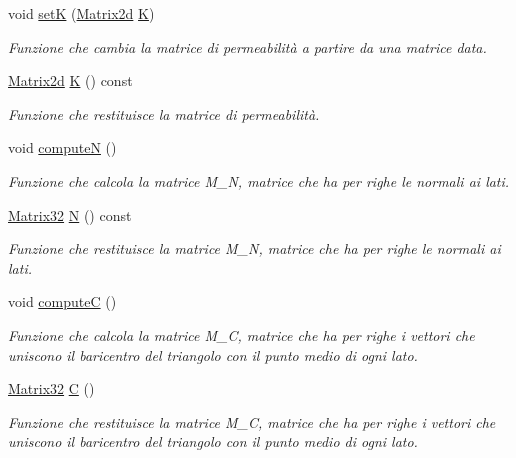 \begin{DoxyCompactItemize}
void \hyperlink{classMatrixBifurcationHandler_acbc7b99389ad5eacd86f73b0ed08829b}{set\-K} (\hyperlink{Core_8h_a1694976dd66ed00e5f0618f4f8821163}{Matrix2d} \hyperlink{classMatrixBifurcationHandler_ac7d63c6d730079862dd8238928d94b26}{K})
\begin{DoxyCompactList}\small\item\em Funzione che cambia la matrice di permeabilità a partire da una matrice data. \end{DoxyCompactList}\item 
\hyperlink{Core_8h_a1694976dd66ed00e5f0618f4f8821163}{Matrix2d} \hyperlink{classMatrixBifurcationHandler_ac7d63c6d730079862dd8238928d94b26}{K} () const 
\begin{DoxyCompactList}\small\item\em Funzione che restituisce la matrice di permeabilità. \end{DoxyCompactList}\item 
void \hyperlink{classMatrixBifurcationHandler_ac134a5731e6614e543241a018ccf8c34}{compute\-N} ()
\begin{DoxyCompactList}\small\item\em Funzione che calcola la matrice M\-\_\-\-N, matrice che ha per righe le normali ai lati. \end{DoxyCompactList}\item 
\hyperlink{Core_8h_aee82131e398edee47a44d675ee802368}{Matrix32} \hyperlink{classMatrixBifurcationHandler_a77f006579fad0f0f08c10bf684bbd16a}{N} () const 
\begin{DoxyCompactList}\small\item\em Funzione che restituisce la matrice M\-\_\-\-N, matrice che ha per righe le normali ai lati. \end{DoxyCompactList}\item 
void \hyperlink{classMatrixBifurcationHandler_ac179ca406307a3d2ee5d5b5af94d265e}{compute\-C} ()
\begin{DoxyCompactList}\small\item\em Funzione che calcola la matrice M\-\_\-\-C, matrice che ha per righe i vettori che uniscono il baricentro del triangolo con il punto medio di ogni lato. \end{DoxyCompactList}\item 
\hyperlink{Core_8h_aee82131e398edee47a44d675ee802368}{Matrix32} \hyperlink{classMatrixBifurcationHandler_a4701fef8d864cb7d61521c8fbe5db2cc}{C} ()
\begin{DoxyCompactList}\small\item\em Funzione che restituisce la matrice M\-\_\-\-C, matrice che ha per righe i vettori che uniscono il baricentro del triangolo con il punto medio di ogni lato. \end{DoxyCompactList}\item 

\end{DoxyCompactItemize}
